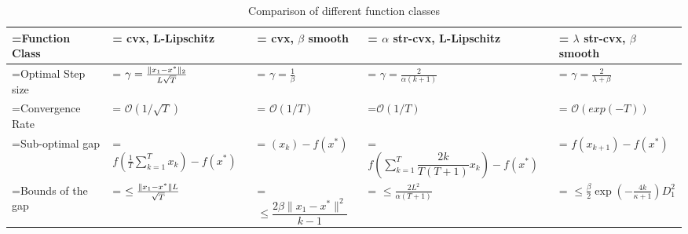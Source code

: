 \documentclass{article}
\DeclarePairedDelimiter{\norm}{\lVert}{\rVert}
\begin{document}
\begin{table}[h]
\footnotesize
\renewcommand{\arraystretch}{1.8}
\centering
    \caption{Comparison of different function classes}
    \begin{tabularx}{\columnwidth}{|>{\hsize=0.8\hsize\linewidth=\hsize}X|>{\hsize=1.1\hsize\linewidth=\hsize}X|>{\hsize=0.8\hsize\linewidth=\hsize}X|>{\hsize=1.3\hsize\linewidth=\hsize}X|>{\hsize=1\hsize\linewidth=\hsize}X|}
        \hline
        Function Class & cvx, L-Lipschitz & cvx, $\beta$ smooth & $\alpha$ str-cvx, L-Lipschitz & $\lambda$ str-cvx, $\beta$ smooth \\
        \hline
        Optimal Step size & $\gamma = \frac{\norm{x_1 - x^\ast}_2}{L \sqrt{T}}$ & $\gamma = \frac{1}{\beta}$ & $\gamma = \frac{2}{\alpha (k+1)}$ & $\gamma = \frac{2}{\lambda + \beta}$ \\
        Convergence Rate     & $\mathcal{O}(1/\sqrt{T})$ & $\mathcal{O}(1/{T})$ &$\mathcal{O}(1/{T})$ & $\mathcal{O}(exp(-T))$    \\
        Sub-optimal gap       & $
f\left(\frac{1}{T}\sum_{k=1}^T x_k\right)-f(x^*)$ & $(x_{k}) - f(x^{*})$ & {\tiny $f\left(\sum_{k=1}^T \dfrac{2k}{T(T+1)} x_k \right)-f(x^{*})$ }& $f(x_{k+1}) - f(x^{*})$  \\
        Bounds of the gap & $\leq \frac{\norm{x_1 - x^\ast}L}{\sqrt{T}}$ & $\leq \dfrac{2 \beta \| x_1 - x^{*} \|^2}{k-1}$ & $ \leq \frac{2 L^2}{\alpha(T+1)} $ &  $\leq \frac{\beta}{2} \exp \left( -\frac{4k}{\kappa + 1} \right) D_1^2$ \\

        \hline
    \end{tabularx}
    \label{table: simulation parameters}
\end{table}



\end{document}
